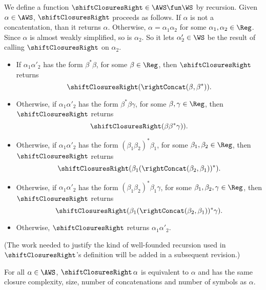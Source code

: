 We define a function $\shiftClosuresRight\in\AWS\fun\WS$ by recursion.
Given $\alpha\in\AWS$, $\shiftClosuresRight$ proceeds as follows.  If
$\alpha$ is not a concatentation, than it returns $\alpha$.
Otherwise, $\alpha = \alpha_1\alpha_2$ for some $\alpha_1,\alpha_2\in\Reg$.
Since $\alpha$ is almost weakly simplified, so is $\alpha_2$.  So it lets
$\alpha'_2\in\WS$ be the result of calling $\shiftClosuresRight$ on
$\alpha_2$.
\begin{itemize}
\item If $\alpha_1\alpha'_2$ has the form $\beta^*\beta$, for some
  $\beta\in\Reg$, then $\shiftClosuresRight$ returns
  \begin{displaymath}
    \shiftClosuresRight(\rightConcat(\beta, \beta^*)) .
  \end{displaymath}

\item Otherwise, if $\alpha_1\alpha'_2$ has the form
  $\beta^*\beta\gamma$, for some $\beta,\gamma\in\Reg$,
  then $\shiftClosuresRight$ returns
  \begin{displaymath}
   \shiftClosuresRight(\beta\beta^*\gamma)) . 
  \end{displaymath}

\item Otherwise, if $\alpha_1\alpha'_2$ has the form
  $(\beta_1\beta_2)^*\beta_1$, for some
  $\beta_1,\beta_2\in\Reg$, then $\shiftClosuresRight$ returns
  \begin{displaymath}
   \shiftClosuresRight(\beta_1(\rightConcat(\beta_2,\beta_1))^*) . 
  \end{displaymath}

\item Otherwise, if $\alpha_1\alpha'_2$ has the form
  $(\beta_1\beta_2)^*\beta_1\gamma$, for some
  $\beta_1,\beta_2,\gamma\in\Reg$, then $\shiftClosuresRight$ returns
  \begin{displaymath}
   \shiftClosuresRight(\beta_1(\rightConcat(\beta_2,\beta_1))^*\gamma) . 
  \end{displaymath}

\item Otherwise, $\shiftClosuresRight$ returns $\alpha_1\alpha'_2$.
\end{itemize}

(The work needed to justify the kind of well-founded recursion used in
$\shiftClosuresRight$'s definition will be added in a subsequent
revision.)

\begin{proposition}
\label{ShiftClosuresRightLem}
For all $\alpha\in\AWS$, $\shiftClosuresRight\,\alpha$ is equivalent to
$\alpha$ and has the same closure complexity, size, number of
concatenations and number of symbols as $\alpha$.
\end{proposition}

